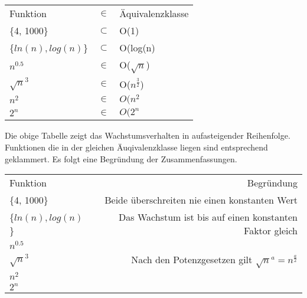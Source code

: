 \begin{tabular}{lcl}
Funktion				& $\in $ 		& Äquivalenzklasse 		\\
\{4, 1000\}				& $\subset$ 	& O(1) 					\\
\{$ln(n), log(n)$\} 	& $\subset$		& O(log(n)				\\
$n^{0.5}$				& $\in$			& O($\sqrt{n}$)			\\
$\sqrt{n}^{3}$			& $\in$			& O($n^{\frac{3}{2}}$)	\\
$n^{2}$					& $\in$			& $O(n^2$				\\ 
$2^{n}$					& $\in$			& $O(2^n$				\\ 
\end{tabular}

Die obige Tabelle zeigt das Wachstumsverhalten in aufasteigender Reihenfolge.
Funktionen die in der gleichen Äuqivalenzklasse liegen sind entsprechend geklammert.
Es folgt eine Begründung der Zusammenfassungen.

\begin{tabular}{l|r}
Funktion				& Begründung \\
\{4, 1000\}				& Beide überschreiten nie einen konstanten Wert \\
\{$ln(n), log(n)$\} 	& Das Wachstum ist bis auf einen konstanten Faktor gleich \\
$n^{0.5}$				&	\\
$\sqrt{n}^{3}$			& Nach den Potenzgesetzen gilt $\sqrt{n}^a = n ^{\frac{a}{2}} $\\
$n^{2}$					& \\ 
$2^{n}$					& \\ 
\end{tabular}

